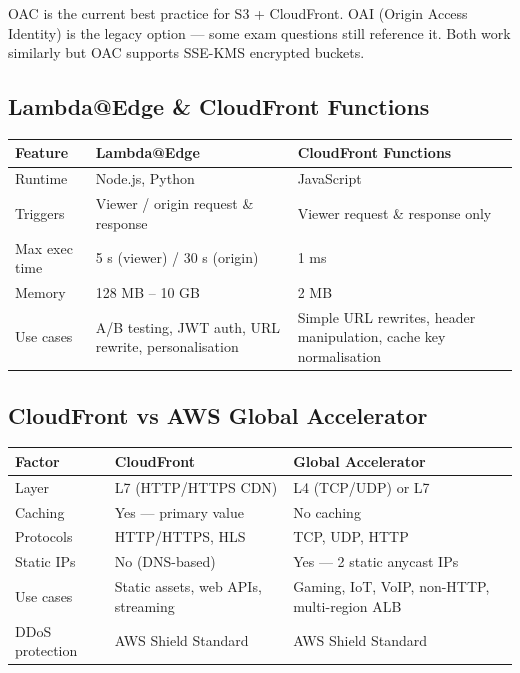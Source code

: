 \begin{examtip}
OAC is the current best practice for S3 + CloudFront. OAI (Origin Access Identity) is
the legacy option --- some exam questions still reference it. Both work similarly but
OAC supports SSE-KMS encrypted buckets.
\end{examtip}

\subsection{Lambda@Edge \& CloudFront Functions}

\begin{comparebox}[title={Edge compute options}]
\begin{tabular}{@{}p{3cm}p{4cm}p{4.5cm}@{}}
\toprule
\textbf{Feature} & \textbf{Lambda@Edge} & \textbf{CloudFront Functions} \\
\midrule
Runtime          & Node.js, Python & JavaScript \\
Triggers         & Viewer / origin request \& response & Viewer request \& response only \\
Max exec time    & 5 s (viewer) / 30 s (origin) & 1 ms \\
Memory           & 128 MB -- 10 GB & 2 MB \\
Use cases        & A/B testing, JWT auth, URL rewrite, personalisation &
                   Simple URL rewrites, header manipulation, cache key normalisation \\
\bottomrule
\end{tabular}
\end{comparebox}

\subsection{CloudFront vs AWS Global Accelerator}

\begin{comparebox}[title={CloudFront vs Global Accelerator}]
\begin{tabular}{@{}p{3.5cm}p{4.2cm}p{4.2cm}@{}}
\toprule
\textbf{Factor} & \textbf{CloudFront} & \textbf{Global Accelerator} \\
\midrule
Layer            & L7 (HTTP/HTTPS CDN) & L4 (TCP/UDP) or L7 \\
Caching          & Yes --- primary value & No caching \\
Protocols        & HTTP/HTTPS, HLS       & TCP, UDP, HTTP \\
Static IPs       & No (DNS-based)        & Yes --- 2 static anycast IPs \\
Use cases        & Static assets, web APIs, streaming &
                   Gaming, IoT, VoIP, non-HTTP, multi-region ALB \\
DDoS protection  & AWS Shield Standard  & AWS Shield Standard \\
\bottomrule
\end{tabular}
\end{comparebox}

